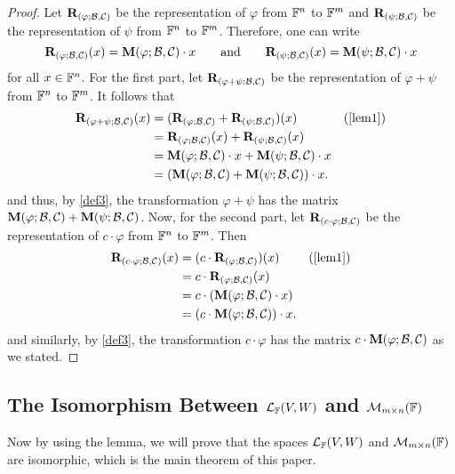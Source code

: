 \begin{proof}
    Let $\mathbf{R}_{(\varphi; \mathcal{B}, \mathcal{C})}$ be the representation of
    $\varphi$ from $\mathbb{F}^{n}$ to $\mathbb{F}^{m}$ and $\mathbf{R}_{(\psi; \mathcal{B}, \mathcal{C})}$
    be the representation of $\psi$ from $\mathbb{F}^{n}$ to $\mathbb{F}^{m}$. Therefore,
    one can write
    \[
        \mathbf{R}_{(\varphi; \mathcal{B}, \mathcal{C})}(x) = \mathbf{M}(\varphi; \mathcal{B}, \mathcal{C}) \cdot x
        \qquad \text{and} \qquad
        \mathbf{R}_{(\psi; \mathcal{B}, \mathcal{C})}(x) = \mathbf{M}(\psi; \mathcal{B}, \mathcal{C}) \cdot x
    \]
    for all $x \in \mathbb{F}^{n}$. For the first part, let $\mathbf{R}_{(\varphi + \psi; \mathcal{B}, \mathcal{C})}$
    be the representation of $\varphi + \psi$ from $\mathbb{F}^{n}$ to $\mathbb{F}^{m}$.
    It follows that
    \begin{align*}
        \rep{\varphi + \psi}(x) &= (\rep{\varphi} + \rep{\psi})(x)            &\text{(\cref{lem1})} \\
                                &= \rep{\varphi}(x) + \rep{\psi}(x) \\
                                &= \mat{\varphi} \cdot x + \mat{\psi} \cdot x \\
                                &= (\mat{\varphi} + \mat{\psi}) \cdot x.
    \end{align*}
    and thus, by \cref{def3}, the transformation $\varphi + \psi$ has the matrix
    $\mathbf{M}(\varphi; \mathcal{B}, \mathcal{C}) + \mathbf{M}(\psi; \mathcal{B}, \mathcal{C})$.
    Now, for the second part, let $\mathbf{R}_{(c \cdot \varphi; \mathcal{B}, \mathcal{C})}$ be
    the representation of $c \cdot \varphi$ from $\mathbb{F}^{n}$ to $\mathbb{F}^{m}$. Then
    \begin{align*}
        \rep{c \cdot \varphi}(x) &= (c \cdot \rep{\varphi})(x)        &\text{(\cref{lem1})} \\
                                 &= c \cdot \rep{\varphi}(x) \\
                                 &= c \cdot (\mat{\varphi} \cdot x) \\
                                 &= (c \cdot \mat{\varphi}) \cdot x. 
    \end{align*}
    and similarly, by \cref{def3}, the transformation $c \cdot \varphi$ has the matrix $c \cdot \mathbf{M}(\varphi; \mathcal{B}, \mathcal{C})$
    as we stated.
\end{proof}


\subsection{The Isomorphism Between $\mathcal{L}_{\mathbb{F}}(V, W)$ and $\mathcal{M}_{m \times n}(\mathbb{F})$}

Now by using the lemma, we will prove that the spaces $\mathcal{L}_{\mathbb{F}}(V, W)$
and $\mathcal{M}_{m \times n}(\mathbb{F})$ are isomorphic, which is the main theorem of this paper.

